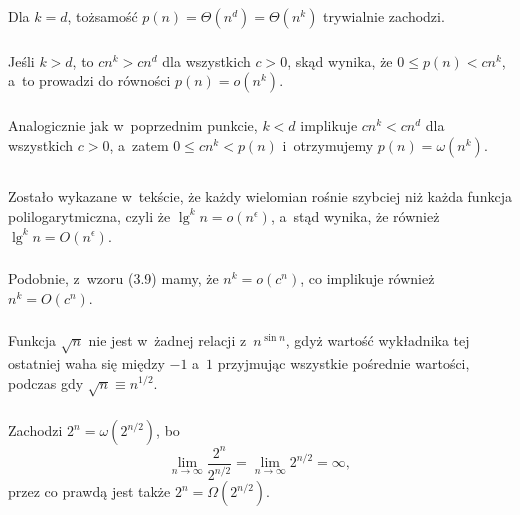 \subsubsection{} %
Dla $k=d$, tożsamość $p(n) = \Theta(n^d) = \Theta(n^k)$ trywialnie zachodzi.

\subsubsection{} %
Jeśli $k>d$, to $cn^k>cn^d$ dla wszystkich $c>0$, skąd wynika, że $0\le p(n)<cn^k$, a~to prowadzi do równości $p(n)=o(n^k)$.

\subsubsection{} %
Analogicznie jak w~poprzednim punkcie, $k<d$ implikuje $cn^k<cn^d$ dla wszystkich $c>0$, a~zatem $0\le cn^k<p(n)$ i~otrzymujemy $p(n)=\omega(n^k)$.

\subsection{} %

\subsubsection{} %
Zostało wykazane w~tekście, że każdy wielomian rośnie szybciej niż każda funkcja polilogarytmiczna, czyli że $\lg^kn=o(n^\epsilon)$, a~stąd wynika, że również $\lg^kn=O(n^\epsilon)$.

\subsubsection{} %
Podobnie, z~wzoru (3.9) mamy, że $n^k=o(c^n)$, co implikuje również $n^k=O(c^n)$.

\subsubsection{} %
Funkcja $\sqrt{n}$ nie jest w~żadnej relacji z~$n^{\sin n}$, gdyż wartość wykładnika tej ostatniej waha się między $-1$ a~$1$ przyjmując wszystkie pośrednie wartości, podczas gdy $\sqrt{n}\equiv n^{1/2}$.

\subsubsection{} %
Zachodzi $2^n=\omega(2^{n/2})$, bo
\[
	\lim_{n\to\infty}\frac{2^n}{2^{n/2}}=\lim_{n\to\infty}2^{n/2}=\infty,
\]
przez co prawdą jest także $2^n=\Omega(2^{n/2})$.

